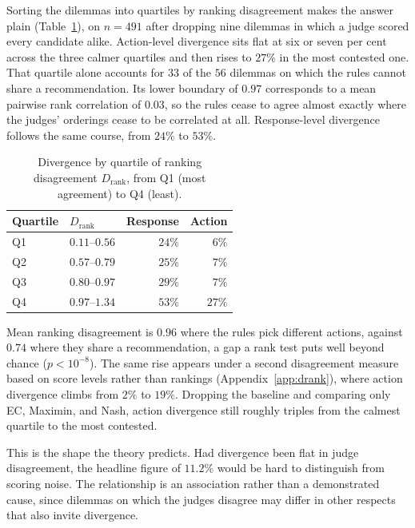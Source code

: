 \documentclass[10pt,twocolumn,a4paper]{article}
\begin{document}
Sorting the dilemmas into quartiles by ranking disagreement makes the
answer plain (Table~\ref{tab:conditional}), on $n = 491$ after dropping
nine dilemmas in which a judge scored every candidate alike. Action-level divergence sits
flat at six or seven per cent across the three calmer quartiles and then
rises to $27\%$ in the most contested one. That quartile alone accounts
for $33$ of the $56$ dilemmas on which the rules cannot share a
recommendation. Its lower boundary of $0.97$ corresponds to a mean
pairwise rank correlation of $0.03$, so the rules cease to agree almost
exactly where the judges' orderings cease to be correlated at all. Response-level
divergence follows the same course, from $24\%$ to $53\%$.

\begin{table}[htbp]
\centering
\small
\caption{Divergence by quartile of ranking disagreement
$D_{\text{rank}}$, from Q1 (most agreement) to Q4 (least).}
\label{tab:conditional}
\vspace{2pt}
\begin{tabular}{@{}l l r r@{}}
\toprule
\textbf{Quartile} & $D_{\text{rank}}$ & \textbf{Response} & \textbf{Action} \\
\midrule
Q1 & $0.11$--$0.56$ & $24\%$ & $6\%$  \\
Q2 & $0.57$--$0.79$ & $25\%$ & $7\%$  \\
Q3 & $0.80$--$0.97$ & $29\%$ & $7\%$  \\
Q4 & $0.97$--$1.34$ & $53\%$ & $27\%$ \\
\bottomrule
\end{tabular}
\end{table}

 Mean ranking disagreement is
$0.96$ where the rules pick different actions, against $0.74$ where
they share a recommendation, a gap a rank test puts well beyond chance
($p < 10^{-8}$). The same rise appears under a second disagreement measure
based on score levels rather than rankings
(Appendix~\ref{app:drank}), where action divergence climbs from $2\%$
to $19\%$. Dropping the baseline and comparing only EC, Maximin, and
Nash, action divergence still roughly triples from the calmest
quartile to the most contested.

This is the shape the theory predicts. Had divergence been flat in
judge disagreement, the headline figure of $11.2\%$ would be hard to
distinguish from scoring noise. The relationship is an association
rather than a demonstrated cause, since dilemmas on which the judges
disagree may differ in other respects that also invite divergence.
\end{document}
